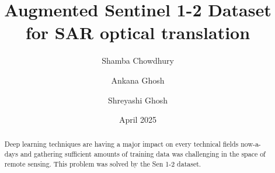 \documentclass[12pt, a4paper]{report}
\title{\textbf{Augmented Sentinel 1-2 Dataset for SAR optical translation}}
\author[1]{Shamba Chowdhury}
\author[1]{Ankana Ghosh}
\author[1]{Shreyashi Ghosh}
\affil[1]{\small{Department of Computer Science and Technology, University of Calcutta}}
\date{April 2025}
\begin{document}
\maketitle

\begin{abstract}
    Deep learning techniques are having a major impact on every technical fields now-a-days and gathering sufficient amounts of training data was challenging in the space of remote sensing. This problem was solved by the Sen 1-2 dataset\cite{tumsen12}.
\end{abstract}



\end{document}
